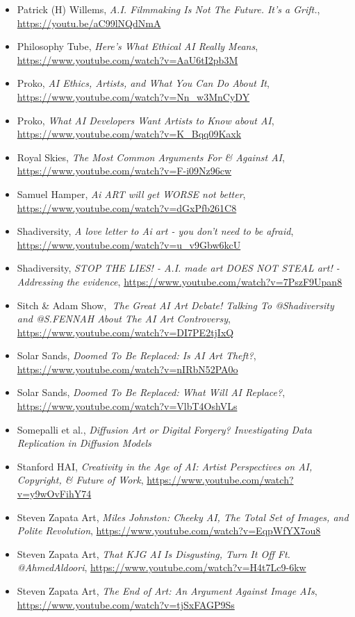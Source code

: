 \documentclass[11pt]{article}
\begin{document}
\begin{itemize}
\item Patrick (H) Willems, \emph{A.I. Filmmaking Is Not The Future. It's a Grift.}, \url{https://youtu.be/aC99lNQdNmA}
\item Philosophy Tube, \emph{Here's What Ethical AI Really Means}, \url{https://www.youtube.com/watch?v=AaU6tI2pb3M}
\item Proko, \emph{AI Ethics, Artists, and What You Can Do About It}, \url{https://www.youtube.com/watch?v=Nn\_w3MnCyDY}
\item Proko, \emph{What AI Developers Want Artists to Know about AI}, \url{https://www.youtube.com/watch?v=K\_Bqq09Kaxk}
\item Royal Skies, \emph{The Most Common Arguments For \& Against AI}, \url{https://www.youtube.com/watch?v=F-i09Nz96cw}
\item Samuel Hamper, \emph{Ai ART will get WORSE not better}, \url{https://www.youtube.com/watch?v=dGxPfb261C8}
\item Shadiversity, \emph{A love letter to Ai art - you don't need to be afraid}, \url{https://www.youtube.com/watch?v=u\_v9Gbw6kcU}
\item Shadiversity, \emph{STOP THE LIES! - A.I. made art DOES NOT STEAL art! - Addressing the evidence}, \url{https://www.youtube.com/watch?v=7PszF9Upan8}
\item Sitch \& Adam Show, \emph{🔴The Great AI Art Debate! Talking To @Shadiversity and @S.FENNAH About The AI Art Controversy}, \url{https://www.youtube.com/watch?v=DI7PE2tjIxQ}
\item Solar Sands, \emph{Doomed To Be Replaced: Is AI Art Theft?}, \url{https://www.youtube.com/watch?v=nIRbN52PA0o}
\item Solar Sands, \emph{Doomed To Be Replaced: What Will AI Replace?}, \url{https://www.youtube.com/watch?v=VlbT4OshVLs}
\item Somepalli et al., \emph{Diffusion Art or Digital Forgery? Investigating Data Replication in Diffusion Models}
\item Stanford HAI, \emph{Creativity in the Age of AI: Artist Perspectives on AI, Copyright, \& Future of Work}, \url{https://www.youtube.com/watch?v=y9wOvFihY74}
\item Steven Zapata Art, \emph{Miles Johnston: Cheeky AI, The Total Set of Images, and Polite Revolution}, \url{https://www.youtube.com/watch?v=EqpWfYX7ou8}
\item Steven Zapata Art, \emph{That KJG AI Is Disgusting, Turn It Off Ft. @AhmedAldoori}, \url{https://www.youtube.com/watch?v=H4t7Lc9-6kw}
\item Steven Zapata Art, \emph{The End of Art: An Argument Against Image AIs}, \url{https://www.youtube.com/watch?v=tjSxFAGP9Ss}

\end{itemize}
\end{document}

